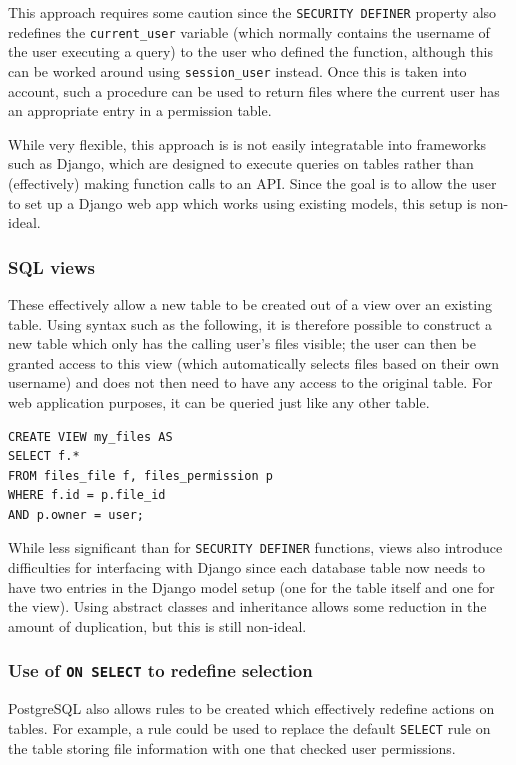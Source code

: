 \documentclass{article}
\begin{document}
This approach requires some caution since the \texttt{SECURITY DEFINER} property also redefines the \verb+current_user+ variable (which normally contains the username of the user executing a query) to the user who defined the function, although this can be worked around using \verb+session_user+ instead. Once this is taken into account, such a procedure can be used to return files where the current user has an appropriate entry in a permission table.

While very flexible, this approach is is not easily integratable into frameworks such as Django, which are designed to execute queries on tables rather than (effectively) making function calls to an API. Since the goal is to allow the user to set up a Django web app which works using existing models, this setup is non-ideal.

\subsubsection{SQL views}
These effectively allow a new table to be created out of a view over an existing table. Using syntax such as the following, it is therefore possible to construct a new table which only has the calling user's files visible; the user can then be granted access to this view (which automatically selects files based on their own username) and does not then need to have any access to the original table. For web application purposes, it can be queried just like any other table.

\begin{verbatim}
CREATE VIEW my_files AS
SELECT f.*
FROM files_file f, files_permission p
WHERE f.id = p.file_id
AND p.owner = user;
\end{verbatim}

While less significant than for \texttt{SECURITY DEFINER} functions, views also introduce difficulties for interfacing with Django since each database table now needs to have two entries in the Django model setup (one for the table itself and one for the view). Using abstract classes and inheritance allows some reduction in the amount of duplication, but this is still non-ideal.

\subsubsection{Use of \texttt{ON SELECT} to redefine selection}
PostgreSQL also allows rules to be created which effectively redefine actions on tables. For example, a rule could be used to replace the default \texttt{SELECT} rule on the table storing file information with one that checked user permissions.
\end{document}
